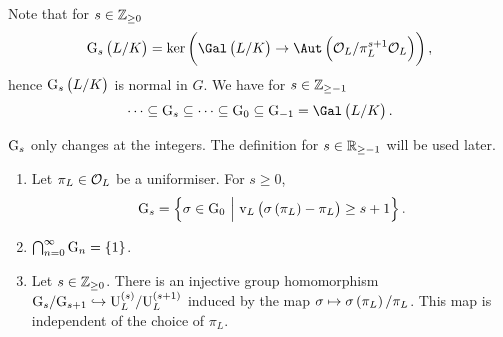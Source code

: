 Note that for $ s \in \mathbb{Z}_{\ge 0} $
$$ \G_s\br{L / K} = \ker \br{\Gal\br{L / K} \to \Aut \br{\OOO_L / \pi_L^{s + 1}\OOO_L}}, $$
hence $ \G_s\br{L / K} $ is normal in $ G $. We have for $ s \in \mathbb{Z}_{\ge -1} $
$$ \dots \subseteq \G_s \subseteq \dots \subseteq \G_0 \subseteq \G_{-1} = \Gal\br{L / K}. $$

\begin{remark*}
$ \mathrm{G}_s $ only changes at the integers. The definition for $ s \in \mathbb{R}_{\ge -1} $ will be used later.
\end{remark*}

\begin{theorem}
\label{thm:15.6}
\hfill
\begin{enumerate}
\item Let $ \pi_L \in \mathcal{O}_L $ be a uniformiser. For $ s \ge 0 $,
$$ \G_s = \cbr{\sigma \in \G_0 \st \v_L\br{\sigma\br{\pi_L} - \pi_L} \ge s + 1}. $$
\item $ \bigcap_{n = 0}^\infty \G_n = \cbr{1} $.
\item Let $ s \in \mathbb{Z}_{\ge 0} $. There is an injective group homomorphism $ \G_s / \G_{s + 1} \hookrightarrow \U_L^{\br{s}} / \U_L^{\br{s + 1}} $ induced by the map $ \sigma \mapsto \sigma\br{\pi_L} / \pi_L $. This map is independent of the choice of $ \pi_L $.
\end{enumerate}
\end{theorem}


